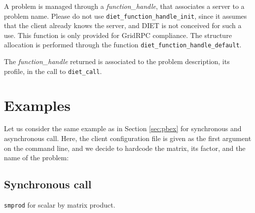 A problem is managed through a \emph{function\_handle}, that
associates a server to a problem name. Please do not use
\texttt{diet\_function\_handle\_init}, since it assumes that the
client already knows the server, and DIET is not conceived for such a
use. This function is only provided for GridRPC compliance. The
structure allocation is performed through the function
\texttt{diet\_function\_handle\_default}.

The \emph{function\_handle} returned is associated to the problem description,
its profile, in the call to \texttt{diet\_call}.

\section{Examples}
\label{sec:cl_ex}

Let us consider the same example as in Section \ref{sec:pbex} for synchronous 
and asynchronous call.  Here, the client configuration file is given as the 
first argument on the command line, and we decide to hardcode the matrix,
its factor, and the name of the problem:

\subsection{Synchronous call}
\texttt{smprod}
for scalar by matrix product.


